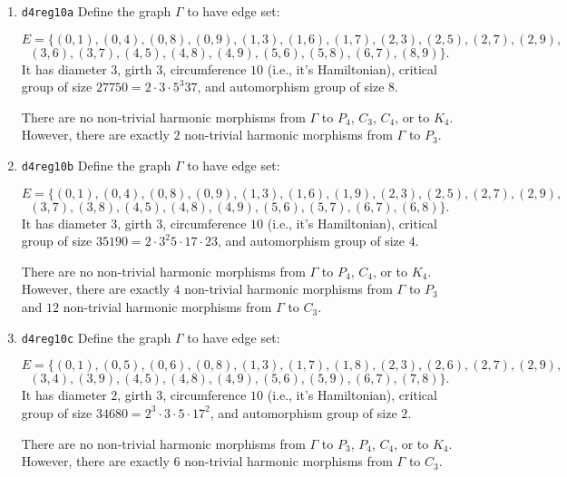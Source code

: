 \documentclass[12pt,letterpaper]{article}
\theoremstyle{definition}
\begin{document}
\begin{enumerate}
\item
{\tt d4reg10a}\newline  
Define the graph  $\Gamma$
  to have edge set:

\[
E = \{
(0, 1), (0, 4), (0, 8), (0, 9), (1, 3), (1, 6), (1, 7), (2, 3), (2, 5), (2, 7), (2, 9),
\]
\[
 (3, 6), (3, 7), (4, 5), (4, 8), (4, 9), (5, 6), (5, 8), (6, 7), (8, 9) 
\}.
\]
It has diameter $3$,
girth $3$, circumference $10$ (i.e., it's Hamiltonian),
critical group of size $27750 = 2\cdot 3\cdot 5^3 37$, 
and automorphism group of size $8$.

There are no non-trivial harmonic morphisms from $\Gamma$ to $P_4$,
$C_3$, $C_4$, or to $K_4$.
However, there are exactly $2$ non-trivial
harmonic morphisms from $\Gamma$ to $P_3$.

\item
  {\tt d4reg10b}\newline  
Define the graph  $\Gamma$
  to have edge set:

\[
E = \{
(0, 1), (0, 4), (0, 8), (0, 9), (1, 3), (1, 6), (1, 9), (2, 3), (2, 5), (2, 7), (2, 9),
\]
\[
 (3, 7), (3, 8), (4, 5), (4, 8), (4, 9), (5, 6), (5, 7), (6, 7), (6, 8)
\}.
\]
It has diameter $3$,
girth $3$, circumference $10$ (i.e., it's Hamiltonian),
critical group of size $35190 = 2\cdot 3^2 5 \cdot 17\cdot 23$, 
and automorphism group of size $4$.

There are no non-trivial harmonic morphisms from $\Gamma$ to $P_4$, $C_4$,
or to $K_4$.
However, there are exactly $4$ non-trivial
harmonic morphisms from $\Gamma$ to $P_3$
and $12$ non-trivial harmonic morphisms from $\Gamma$ to $C_3$.


\item
  {\tt d4reg10c}\newline  
  Define the graph  $\Gamma$
  to have edge set:

\[
E = \{
(0, 1), (0, 5), (0, 6), (0, 8), (1, 3), (1, 7), (1, 8), (2, 3), (2, 6), (2, 7), (2, 9),
\]
\[
(3, 4), (3, 9), (4, 5), (4, 8), (4, 9), (5, 6), (5, 9), (6, 7), (7, 8)
\}.
\]
It has diameter $2$,
girth $3$, circumference $10$ (i.e., it's Hamiltonian),
critical group of size $34680 = 2^3\cdot 3\cdot 5\cdot 17^2$, 
and automorphism group of size $2$.

There are no non-trivial harmonic morphisms from $\Gamma$ to $P_3$, $P_4$,
$C_4$, or to $K_4$.
However, there are exactly $6$ non-trivial harmonic morphisms
from $\Gamma$ to $C_3$. 


\end{enumerate}
\end{document}

